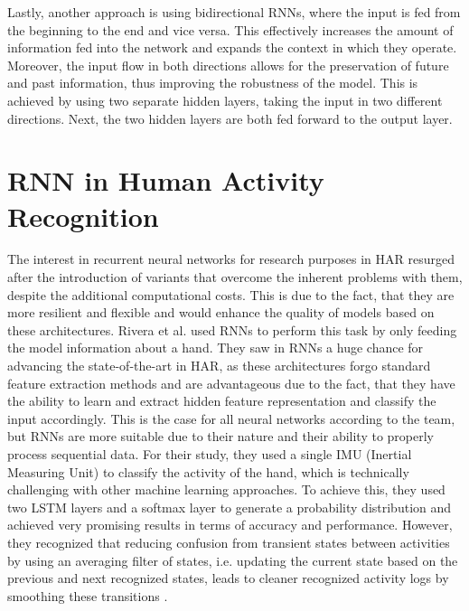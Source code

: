 			Lastly, another approach is using bidirectional RNNs, where the input is fed from the beginning to the end and vice versa. This effectively increases the amount of information fed into the network and expands the context in which they operate. Moreover, the input flow in both directions allows for the preservation of future and past information, thus improving the robustness of the model. This is achieved by using two separate hidden layers, taking the input in two different directions. Next, the two hidden layers are both fed forward to the output layer\cite{graves2013hybrid}.
	\section{RNN in Human Activity Recognition}
		The interest in recurrent neural networks for research purposes in HAR resurged after the introduction of variants that overcome the inherent problems with them, despite the additional computational costs. This is due to the fact, that they are more resilient and flexible and would enhance the quality of models based on these architectures. Rivera et al. used RNNs to perform this task by only feeding the model information about a hand. They saw in RNNs a huge chance for advancing the state-of-the-art in HAR, as these architectures forgo standard feature extraction methods and are advantageous due to the fact, that they have the ability to learn and extract hidden feature representation and classify the input accordingly. This is the case for all neural networks according to the team, but RNNs are more suitable due to their nature and their ability to properly process sequential data. For their study, they used a single IMU (Inertial Measuring Unit) to classify the activity of the hand, which is technically challenging with other machine learning approaches. To achieve this, they used two LSTM layers and a softmax layer to generate a probability distribution and achieved very promising results in terms of accuracy and performance. However, they recognized that reducing confusion from transient states between activities by using an averaging filter of states, i.e. updating the current state based on the previous and next recognized states, leads to cleaner recognized activity logs by smoothing these transitions \cite{rivera2017recognition}.\newline 
